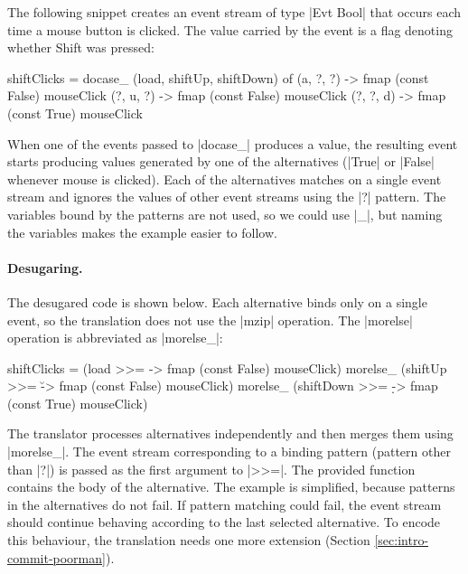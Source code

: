 \documentclass{sigplanconf}
\begin{document}
The following snippet creates an event stream of type |Evt Bool| that occurs each time a mouse 
button is clicked. The value carried by the event is a flag denoting whether Shift was
pressed:

\begin{code}
shiftClicks = docase_ (load, shiftUp, shiftDown) of
  (a, ?, ?)  -> fmap (const False) mouseClick
  (?, u, ?)  -> fmap (const False) mouseClick
  (?, ?, d)  -> fmap (const True) mouseClick
\end{code}
When one of the events passed to |docase_| produces a value, the resulting event starts producing
values generated by one of the alternatives (|True| or |False| whenever mouse is clicked).
Each of the alternatives matches on a single event stream and ignores the values of other event 
streams using the |?| pattern. The variables bound by the patterns are not used, so we could use 
|_|, but naming the variables makes the example easier to follow.

\paragraph{Desugaring.}
The desugared code is shown below. Each alternative binds only on a single event, 
so the translation does not use the |mzip| operation. The |morelse| operation is abbreviated 
as |morelse_|:

\begin{code}
shiftClicks = 
  (load >>= \a -> fmap (const False) mouseClick)  morelse_
  (shiftUp >>= \u -> fmap (const False) mouseClick) morelse_
  (shiftDown >>= \d -> fmap (const True) mouseClick)
\end{code}
The translator processes alternatives independently and then merges them using |morelse_|. The 
event stream corresponding to a binding pattern (pattern other than |?|) is passed as the first 
argument to |>>=|. The provided function contains the body of the alternative. 
The example is simplified, because patterns in the alternatives do not fail. If pattern matching
could fail, the event stream should continue behaving according to the last selected alternative. To
encode this behaviour, the translation needs one more extension (Section \ref{sec:intro-commit-poorman}).
\end{document}
